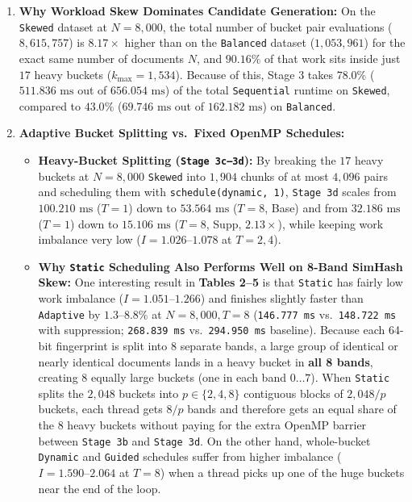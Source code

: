 \documentclass[11pt,a4paper]{article}
\renewcommand{\_}{\textunderscore\allowbreak}
\begin{document}
\begin{enumerate}
    \item \textbf{Why Workload Skew Dominates Candidate Generation:}
    On the \texttt{Skewed} dataset at $N = 8,000$, the total number of bucket pair evaluations ($8,615,757$) is $8.17\times$ higher than on the \texttt{Balanced} dataset ($1,053,961$) for the exact same number of documents $N$, and $90.16\%$ of that work sits inside just $17$ heavy buckets ($k_{\max} = 1,534$). Because of this, Stage 3 takes $78.0\%$ ($511.836\text{ ms}$ out of $656.054\text{ ms}$) of the total \texttt{Sequential} runtime on \texttt{Skewed}, compared to $43.0\%$ ($69.746\text{ ms}$ out of $162.182\text{ ms}$) on \texttt{Balanced}.

    \item \textbf{Adaptive Bucket Splitting vs.\ Fixed OpenMP Schedules:}
    \begin{itemize}
        \item \textbf{Heavy-Bucket Splitting (\texttt{Stage 3c--3d}):} By breaking the $17$ heavy buckets at $N=8,000$ \texttt{Skewed} into $1,904$ chunks of at most $4,096$ pairs and scheduling them with \texttt{schedule(dynamic, 1)}, \texttt{Stage 3d} scales from $100.210\text{ ms}$ ($T=1$) down to $53.564\text{ ms}$ ($T=8$, Base) and from $32.186\text{ ms}$ ($T=1$) down to $15.106\text{ ms}$ ($T=8$, Supp, $2.13\times$), while keeping work imbalance very low ($I = 1.026\text{--}1.078$ at $T=2, 4$).
        \item \textbf{Why \texttt{Static} Scheduling Also Performs Well on 8-Band SimHash Skew:} One interesting result in \textbf{Tables 2--5} is that \texttt{Static} has fairly low work imbalance ($I = 1.051\text{--}1.266$) and finishes slightly faster than \texttt{Adaptive} by $1.3\text{--}8.8\%$ at $N=8,000, T=8$ (\texttt{146.777 ms} vs.\ \texttt{148.722 ms} with suppression; \texttt{268.839 ms} vs.\ \texttt{294.950 ms} baseline). Because each 64-bit fingerprint is split into $8$ separate bands, a large group of identical or nearly identical documents lands in a heavy bucket in \textbf{all 8 bands}, creating 8 equally large buckets (one in each band $0 \dots 7$). When \texttt{Static} splits the $2,048$ buckets into $p \in \{2, 4, 8\}$ contiguous blocks of $2,048/p$ buckets, each thread gets $8/p$ bands and therefore gets an equal share of the 8 heavy buckets without paying for the extra OpenMP barrier between \texttt{Stage 3b} and \texttt{Stage 3d}. On the other hand, whole-bucket \texttt{Dynamic} and \texttt{Guided} schedules suffer from higher imbalance ($I = 1.590\text{--}2.064$ at $T=8$) when a thread picks up one of the huge buckets near the end of the loop.

\end{itemize}
\end{enumerate}
\end{document}
